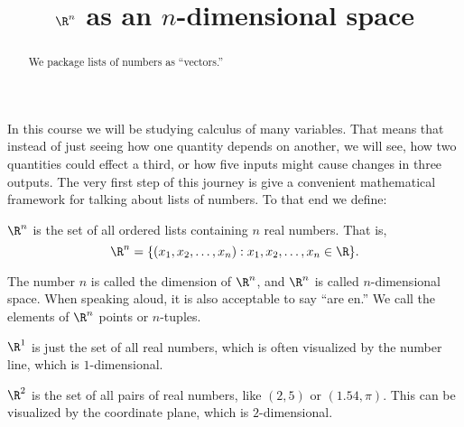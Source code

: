 \documentclass{ximera}
\title{$\R^n$ as an $n$-dimensional space}
\begin{document}
\begin{abstract}
  We package lists of numbers as ``vectors.''
\end{abstract}

In this course we will be studying calculus of many variables.  That
means that instead of just seeing how one quantity depends on another,
we will see, how two quantities could effect a third, or how five
inputs might cause changes in three outputs.  The very first step of
this journey is give a convenient mathematical framework for talking
about lists of numbers.  To that end we define:

\begin{definition}
  $\R^n$ is the set of all ordered lists containing $n$ real numbers.
  That is, \[\R^n = \{ (x_1,x_2,\dots, x_n) : x_1,x_2,\dots, x_n \in \R
  \}.\]
\end{definition}

The number $n$ is called the dimension of $\R^n$, and $\R^n$ is called $n$-dimensional space.  When speaking aloud, it is also acceptable to say ``are en.''
 We call the elements of $\R^n$ points or $n$-tuples.

\begin{example}
	$\R^1$ is just the set of all real numbers, which is often visualized by the number line, which is $1$-dimensional.
	
\end{example}

\begin{example}
	$\R^2$ is the set of all pairs of real numbers, like $(2,5)$ or $(1.54,\pi)$. This can be visualized by the coordinate plane, which is $2$-dimensional.
	
	
\end{example}
\end{document}
